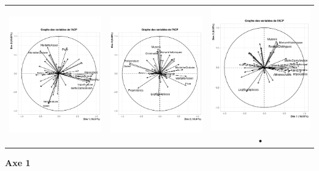 \documentclass{article}
\begin{document}
\begin{center}
\begin{tabular}{ccc}
\includegraphics[width=0.3\linewidth]{images/ACP_var_12_contrib.png} & 
\includegraphics[width=0.3\linewidth]{images/ACP_var_23_contrib.png} & \includegraphics[width=0.3\linewidth]{images/ACP_var_13_contrib.png}• \\ 
\end{tabular} 
\end{center}

{\large \textbf{Axe 1}}
\end{document}
